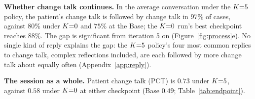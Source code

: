 \textbf{Whether change talk continues.} In the average conversation under the $K{=}5$ policy, the
patient's change talk is followed by change talk in $97\%$ of cases, against $80\%$ under $K{=}0$ and
$75\%$ at the Base; the $K{=}0$ run's best checkpoint reaches $88\%$. The gap is significant from
iteration 5 on (Figure~\ref{fig:process}e).
No single kind of reply explains the gap: the $K{=}5$ policy's four most common replies to change
talk, complex reflections included, are each followed by more change talk about equally often
(Appendix~\ref{app:reply}).

\textbf{The session as a whole.}
Patient change talk (PCT) is $0.73$ under $K{=}5$, against $0.58$ under $K{=}0$ at either checkpoint (Base
$0.49$; Table~\ref{tab:endpoint}).

